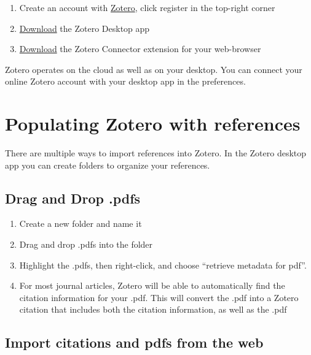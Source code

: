 \documentclass[]{book}
\providecommand{\tightlist}{%
  \setlength{\itemsep}{0pt}\setlength{\parskip}{0pt}}
\begin{document}
\begin{enumerate}
\def\labelenumi{\arabic{enumi}.}
\tightlist
\item
  Create an account with \href{https://www.zotero.org}{Zotero}, click
  register in the top-right corner
\item
  \href{https://www.zotero.org/download/}{Download} the Zotero Desktop
  app
\item
  \href{https://www.zotero.org/download/}{Download} the Zotero Connector
  extension for your web-browser
\end{enumerate}

Zotero operates on the cloud as well as on your desktop. You can connect
your online Zotero account with your desktop app in the preferences.

\section{Populating Zotero with
references}\label{populating-zotero-with-references}

There are multiple ways to import references into Zotero. In the Zotero
desktop app you can create folders to organize your references.

\subsection{Drag and Drop .pdfs}\label{drag-and-drop-.pdfs}

\begin{enumerate}
\def\labelenumi{\arabic{enumi}.}
\tightlist
\item
  Create a new folder and name it
\item
  Drag and drop .pdfs into the folder
\item
  Highlight the .pdfs, then right-click, and choose ``retrieve metadata
  for pdf''.
\item
  For most journal articles, Zotero will be able to automatically find
  the citation information for your .pdf. This will convert the .pdf
  into a Zotero citation that includes both the citation information, as
  well as the .pdf
\end{enumerate}

\subsection{Import citations and pdfs from the
web}\label{import-citations-and-pdfs-from-the-web}
\end{document}
